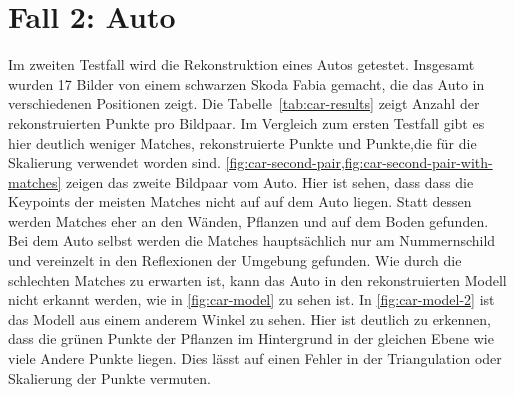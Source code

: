 \section{Fall 2: Auto}
\label{sec:testcase-car}
Im zweiten Testfall wird die Rekonstruktion eines Autos getestet. 
Insgesamt wurden 17 Bilder von einem schwarzen Skoda Fabia gemacht, die das Auto in verschiedenen Positionen zeigt.
Die Tabelle~\cref{tab:car-results} zeigt Anzahl der rekonstruierten Punkte pro Bildpaar.
Im Vergleich zum ersten Testfall gibt es hier deutlich weniger Matches, rekonstruierte Punkte und Punkte,die für die Skalierung verwendet worden sind.
\cref{fig:car-second-pair,fig:car-second-pair-with-matches} zeigen das zweite Bildpaar vom Auto.
Hier ist sehen, dass dass die Keypoints der meisten Matches nicht auf auf dem Auto liegen.
Statt dessen werden Matches eher an den Wänden, Pflanzen und auf dem Boden gefunden.
Bei dem Auto selbst werden die Matches hauptsächlich nur am Nummernschild und vereinzelt in den Reflexionen der Umgebung gefunden.
Wie durch die schlechten Matches zu erwarten ist, kann das Auto in den rekonstruierten Modell nicht erkannt werden, wie in \cref{fig:car-model} zu sehen ist.
In \cref{fig:car-model-2} ist das Modell aus einem anderem Winkel zu sehen.
Hier ist deutlich zu erkennen, dass die grünen Punkte der Pflanzen im Hintergrund in der gleichen Ebene wie viele Andere Punkte liegen. 
Dies lässt auf einen Fehler in der Triangulation oder Skalierung der Punkte vermuten.

